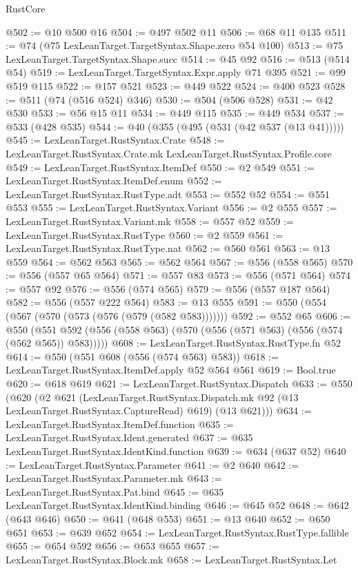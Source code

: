 \begin{lexlean}{RustCore}
\begin{coremodule}
@502 := @10 @500 @16
@504 := @497 @502 @11
@506 := @68 @11 @135
@511 := @74 (@75 LexLeanTarget.TargetSyntax.Shape.zero @54 @100)
@513 := @75 LexLeanTarget.TargetSyntax.Shape.succ
@514 := @45 @92
@516 := @513 (@514 @54)
@519 := LexLeanTarget.TargetSyntax.Expr.apply @71 @395
@521 := @99 @519 @115
@522 := @157 @521
@523 := @449 @522
@524 := @400 @523
@528 := @511 (@74 (@516 @524) @346)
@530 := @504 (@506 @528)
@531 := @42 @530
@533 := @56 @15 @11
@534 := @449 @115
@535 := @449 @534
@537 := @533 (@428 @535)
@544 := @40 (@355 (@495 (@531 (@42 @537 (@13 @41)))))
@545 := LexLeanTarget.RustSyntax.Crate
@548 := LexLeanTarget.RustSyntax.Crate.mk LexLeanTarget.RustSyntax.Profile.core
@549 := LexLeanTarget.RustSyntax.ItemDef
@550 := @2 @549
@551 := LexLeanTarget.RustSyntax.ItemDef.enum
@552 := LexLeanTarget.RustSyntax.RustType.adt
@553 := @552 @52
@554 := @551 @553
@555 := LexLeanTarget.RustSyntax.Variant
@556 := @2 @555
@557 := LexLeanTarget.RustSyntax.Variant.mk
@558 := @557 @52
@559 := LexLeanTarget.RustSyntax.RustType
@560 := @2 @559
@561 := LexLeanTarget.RustSyntax.RustType.nat
@562 := @560 @561
@563 := @13 @559
@564 := @562 @563
@565 := @562 @564
@567 := @556 (@558 @565)
@570 := @556 (@557 @65 @564)
@571 := @557 @83
@573 := @556 (@571 @564)
@574 := @557 @92
@576 := @556 (@574 @565)
@579 := @556 (@557 @187 @564)
@582 := @556 (@557 @222 @564)
@583 := @13 @555
@591 := @550 (@554 (@567 (@570 (@573 (@576 (@579 (@582 @583)))))))
@592 := @552 @65
@606 := @550 (@551 @592 (@556 (@558 @563) (@570 (@556 (@571 @563) (@556 (@574 (@562 @565)) @583)))))
@608 := LexLeanTarget.RustSyntax.RustType.fn @52
@614 := @550 (@551 @608 (@556 (@574 @563) @583))
@618 := LexLeanTarget.RustSyntax.ItemDef.apply @52 @564 @561
@619 := Bool.true
@620 := @618 @619
@621 := LexLeanTarget.RustSyntax.Dispatch
@633 := @550
    (@620
      (@2
        @621
        (LexLeanTarget.RustSyntax.Dispatch.mk @92 (@13 LexLeanTarget.RustSyntax.CaptureRead) @619)
        (@13 @621)))
@634 := LexLeanTarget.RustSyntax.ItemDef.function
@635 := LexLeanTarget.RustSyntax.Ident.generated
@637 := @635 LexLeanTarget.RustSyntax.IdentKind.function
@639 := @634 (@637 @52)
@640 := LexLeanTarget.RustSyntax.Parameter
@641 := @2 @640
@642 := LexLeanTarget.RustSyntax.Parameter.mk
@643 := LexLeanTarget.RustSyntax.Pat.bind
@645 := @635 LexLeanTarget.RustSyntax.IdentKind.binding
@646 := @645 @52
@648 := @642 (@643 @646)
@650 := @641 (@648 @553)
@651 := @13 @640
@652 := @650 @651
@653 := @639 @652
@654 := LexLeanTarget.RustSyntax.RustType.fallible
@655 := @654 @592
@656 := @653 @655
@657 := LexLeanTarget.RustSyntax.Block.mk
@658 := LexLeanTarget.RustSyntax.Let

\end{coremodule}
\end{lexlean}
